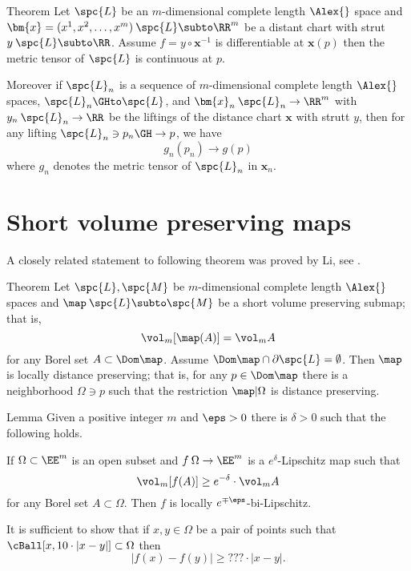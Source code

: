 \begin{thm}{Theorem}
Let $\spc{L}$ be an $m$-dimensional complete length $\Alex{}$ space
and $\bm{x}=(x^1,x^2,\dots,x^m)\:\spc{L}\subto\RR^m$ be a distant chart with strut $y\:\spc{L}\subto\RR$.
Assume $f=y\circ\bm{x}^{-1}$ is differentiable at $\bm{x}(p)$
then the metric tensor of $\spc{L}$ is continuous at $p$.

Moreover if $\spc{L}_n$ is a sequence of $m$-dimensional complete length $\Alex{}$ spaces,
$\spc{L}_n\GHto\spc{L}$,
and $\bm{x}_n\:\spc{L}_n\to\RR^m$ with $y_n\:\spc{L}_n\to\RR$ be the liftings of the distance chart $\bm{x}$ with strutt $y$, then
for any lifting $\spc{L}_n\ni p_n\GH\to p$, we have
\[g_n(p_n)\to g(p)\]
where $g_n$ denotes the metric tensor of $\spc{L}_n$ in $\bm{x}_n$.
\end{thm}




\section{Short volume preserving maps}

A closely related statement to following theorem 
was proved by Li, see \cite[Theorem A]{li}.

\begin{thm}{Theorem}\label{thm:li}
Let $\spc{L},\spc{M}$ be $m$-dimensional complete length $\Alex{}$ spaces
and $\map\:\spc{L}\subto \spc{M}$ 
be a short volume preserving submap;
that is,
\[\vol_m[\map(A)]=\vol_m A\]
for any Borel set $A\subset \Dom \map$.
Assume $\Dom\map\cap\partial\spc{L}=\emptyset$.
Then $\map$
is locally distance preserving;
that is, for any $p\in \Dom \map$
there is a neighborhood $\Omega\ni p$
such that the restriction $\map|\Omega$ is distance preserving.
\end{thm}

\begin{thm}{Lemma}\label{lem:almost-li}
Given a positive integer $m$ and $\eps>0$  
there is $\delta>0$ 
such that the following holds.

If $\Omega\subset\EE^m$ is an open subset
and $f\:\Omega\to\EE^m$ is a $e^\delta$-Lipschitz map
such that 
\[\vol_m [f(A)]\ge e^{-\delta}\cdot\vol_m A\]
for any Borel set $A\subset \Omega$.
Then $f$ is locally $e^{\mp\eps}$-bi-Lipschitz.
\end{thm}

It is sufficient to show that if $x,y\in \Omega$
be a pair of points such that $\cBall[x,10\cdot|x-y|]\subset\Omega$
then 
\[|f(x)-f(y)|\ge???\cdot|x-y|.\]

